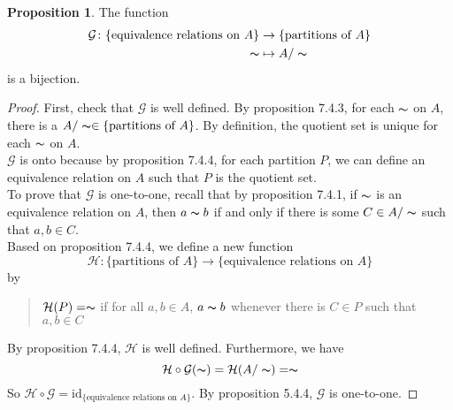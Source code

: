 \documentclass[14pt]{article}
\theoremstyle{definition}
\newtheorem{proposition}[definition]{Proposition}
\newcommand{\eq}{\thicksim}
\begin{document}
\vspace{2mm}

\begin{proposition}
The function 
\begin{equation*}
    \begin{split}
        \mathcal{G} \colon \{\text{equivalence relations on } A\}&\rightarrow \{\text{partitions of } A\}\\
        \eq&\mapsto A/\eq
    \end{split}
\end{equation*}
is a bijection.
\end{proposition}

\begin{proof}
    First, check that $\mathcal{G}$ is well defined. By proposition 7.4.3, for each 
    $\eq$ on $A$,  there is a $A/\eq  \in \{\text{partitions of } A\}$. By definition, the quotient set is unique for each $\eq$ on $A$.\\
    $\mathcal{G}$ is onto because by proposition 7.4.4, for each partition $P$, we can define
    an equivalence relation on $A$ such that $P$ is the quotient set.\\
    To prove that $\mathcal{G}$ is one-to-one, recall that by proposition 7.4.1, if $\eq$
    is an equivalence relation on $A$, then $a\eq b$ if and only if there is some $C\in A/\eq$
    such that $a,b \in C$.\\
    Based on proposition 7.4.4, we define a new function
    \begin{equation*}
        \mathcal{H}\colon \{\text{partitions of } A\}\rightarrow \{\text{equivalence relations on } A\}
    \end{equation*}
    by
    \begin{quote}
        \centering $\mathcal{H}(P)=\eq$ if for all $a,b\in A$, $a\eq b$ whenever there is $C\in P$ such that $a,b\in C$
    \end{quote}
    By proposition 7.4.4,  $\mathcal{H}$ is well defined. Furthermore, we have
    \begin{equation*}
        \mathcal{H}\circ\mathcal{G}(\eq)=\mathcal{H}(A/\eq)=\eq
    \end{equation*}
    So $\mathcal{H}\circ\mathcal{G}=\mathrm{id}_{\{\text{equivalence relations on } A\}} $. By proposition
    5.4.4, $\mathcal{G}$ is one-to-one.

\end{proof}

\vspace{5mm}
\end{document}
